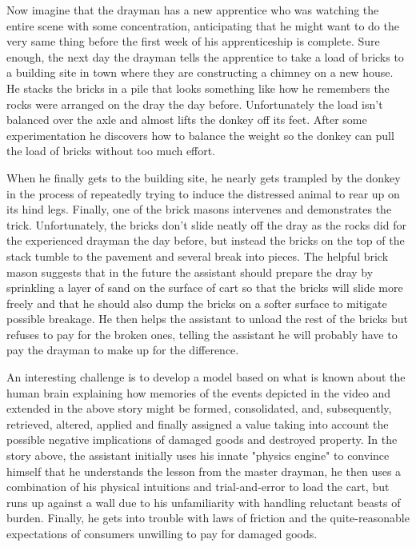 Now imagine that the drayman has a new apprentice who was watching the entire scene with some concentration, anticipating that he might want to do the very same thing before the first week of his apprenticeship is complete. Sure enough, the next day the drayman tells the apprentice to take a load of bricks to a building site in town where they are constructing a chimney on a new house. He stacks the bricks in a pile that looks something like how he remembers the rocks were arranged on the dray the day before. Unfortunately the load isn't balanced over the axle and almost lifts the donkey off its feet. After some experimentation he discovers how to balance the weight so the donkey can pull the load of bricks without too much effort.

When he finally gets to the building site, he nearly gets trampled by the donkey in the process of repeatedly trying to induce the distressed animal to rear up on its hind legs. Finally, one of the brick masons intervenes and demonstrates the trick. Unfortunately, the bricks don’t slide neatly off the dray as the rocks did for the experienced drayman the day before, but instead the bricks on the top of the stack tumble to the pavement and several break into pieces. The helpful brick mason suggests that in the future the assistant should prepare the dray by sprinkling a layer of sand on the surface of cart so that the bricks will slide more freely and that he should also dump the bricks on a softer surface to mitigate possible breakage. He then helps the assistant to unload the rest of the bricks but refuses to pay for the broken ones, telling the assistant he will probably have to pay the drayman to make up for the difference.

An interesting challenge is to develop a model based on what is known about the human brain explaining how memories of the events depicted in the video and extended in the above story might be formed, consolidated, and, subsequently, retrieved, altered, applied and finally assigned a value taking into account the possible negative implications of damaged goods and destroyed property. In the story above, the assistant initially uses his innate "physics engine" to convince himself that he understands the lesson from the master drayman, he then uses a combination of his physical intuitions and trial-and-error to load the cart, but runs up against a wall due to his unfamiliarity with handling reluctant beasts of burden. Finally, he gets into trouble with laws of friction and the quite-reasonable expectations of consumers unwilling to pay for damaged goods. 

